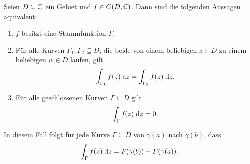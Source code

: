 \documentclass[a4paper,twoside,DIV15,BCOR12mm]{scrbook}
\begin{document}
\begin{satz} \label{satz2.13}
  Seien $D\subseteq\mathbb{C}$ ein Gebiet und $f\in C(D,\mathbb{C})$. Dann sind die folgenden Aussagen äquivalent:
  \begin{enumerate}
  \item $f$ besitzt eine Stammfunktion $F$.
  \item Für alle Kurven $\Gamma_1, \Gamma_2 \subseteq D$, die beide von einem beliebigen $z\in D$ zu einem beliebigen $w\in D$
    laufen, gilt \[\int_{\Gamma_1}^{}{f(z)}\;\mathrm{d} z = \int_{\Gamma_2}^{}{f(z)}\;\mathrm{d} z.\]
  \item Für alle geschlossenen Kurven $\Gamma\subseteq D$ gilt \[\int_{\Gamma}^{}{f(z)}\;\mathrm{d} z = 0.\]
  \end{enumerate}
  In diesem Fall folgt für jede Kurve $\Gamma\subseteq D$ von $\gamma(a)$ nach $\gamma(b)$, dass
  \[\int_{\Gamma}^{}{f(z)}\;\mathrm{d} z = F(\gamma(b)) - F(\gamma(a)).\]
\end{satz}
\end{document}

